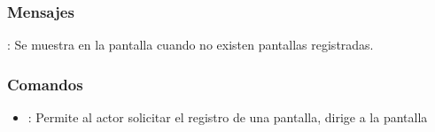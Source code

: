 \subsubsection{Mensajes}

\begin{Citemize}
	\item {}: Se muestra en la pantalla  cuando no existen pantallas registradas.
\end{Citemize}

\label{IU7A}
\subsubsection{Comandos}
\begin{itemize}
	\item {}: Permite al actor solicitar el registro de una pantalla, dirige a la pantalla 
\end{itemize}